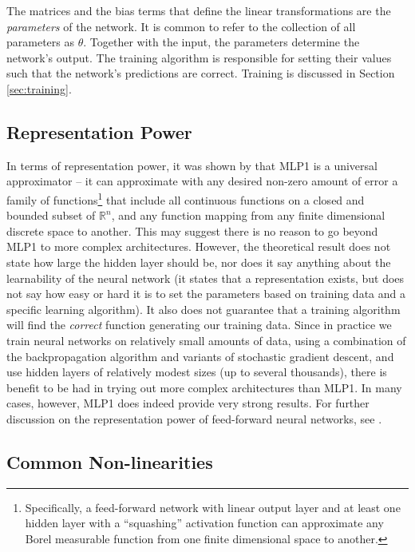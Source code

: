 \documentclass[jair,twoside,11pt,theapa]{article}
\begin{document}
{The matrices and the bias terms that define the linear transformations are the
\emph{parameters} of the network. It is common to refer to the collection of all
parameters as $\theta$. Together with the input, the parameters
determine the network's output. The training algorithm is responsible for
setting their values such that the network's predictions are correct.
Training is discussed in Section \ref{sec:training}. 



\subsection{Representation Power} In terms of representation power, it was shown
by \cite{hornik1989multilayer,cybenko1989approximation} that MLP1 is a universal
approximator -- it can approximate with any desired non-zero amount of error a
family of functions\footnote{Specifically, a feed-forward network with linear
output layer and at least one hidden layer with a ``squashing'' activation function
can approximate any Borel measurable function from one finite dimensional space to another.} 
that include all continuous functions on a closed and bounded
subset of $\mathbb{R}^n$, and any function mapping from any finite dimensional
discrete space to another. This may suggest there is no reason to go
beyond MLP1 to more complex architectures. However, the theoretical result does not state 
how large the hidden layer should be, nor does it say anything about the
learnability of the neural network (it states that a representation exists, but
does not say how easy or hard it is to set the parameters based on training data
and a specific learning algorithm).  It also does not guarantee that a
training algorithm will find the \emph{correct} function generating our training data.
Since in practice we train neural networks on relatively small amounts of data,
using a combination of the backpropagation algorithm and variants of stochastic gradient descent,
and use hidden layers of relatively modest sizes (up to several thousands), there is
benefit to be had in trying out more complex architectures than MLP1.
In many
cases, however, MLP1 does indeed provide very strong results.
For further discussion on the representation power of feed-forward neural
networks, see \cite[Section 6.5]{bengio2015deep}.

\subsection{Common Non-linearities}

}
\end{document}
